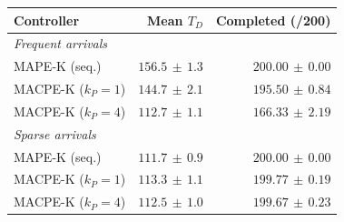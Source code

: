 {\footnotesize\setlength{\tabcolsep}{2pt}%
\begin{tabular*}{\columnwidth}{@{\extracolsep{\fill}}lrr@{}}
\toprule
Controller & Mean $T_D$ & Completed (/200) \\
\midrule
\multicolumn{3}{l}{\textit{Frequent arrivals}} \\
MAPE-K (seq.) & $156.5\,\pm\,1.3$ & $200.00\,\pm\,0.00$ \\
MACPE-K ($k_P=1$) & $144.7\,\pm\,2.1$ & $195.50\,\pm\,0.84$ \\
MACPE-K ($k_P=4$) & $112.7\,\pm\,1.1$ & $166.33\,\pm\,2.19$ \\
\midrule
\multicolumn{3}{l}{\textit{Sparse arrivals}} \\
MAPE-K (seq.) & $111.7\,\pm\,0.9$ & $200.00\,\pm\,0.00$ \\
MACPE-K ($k_P=1$) & $113.3\,\pm\,1.1$ & $199.77\,\pm\,0.19$ \\
MACPE-K ($k_P=4$) & $112.5\,\pm\,1.0$ & $199.67\,\pm\,0.23$ \\
\bottomrule
\end{tabular*}}%
